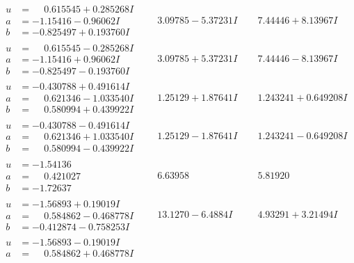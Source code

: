 \documentclass[1p]{elsarticle_modified}
\theoremstyle{definition}
\begin{document}
$$\begin{array}{c|c|c}
\begin{aligned}
u &= \phantom{-}0.615545 + 0.285268 I \\
a &= -1.15416 - 0.96062 I \\
b &= -0.825497 + 0.193760 I\end{aligned}
 & \phantom{-}3.09785 - 5.37231 I & \phantom{-}7.44446 + 8.13967 I \\ \hline\begin{aligned}
u &= \phantom{-}0.615545 - 0.285268 I \\
a &= -1.15416 + 0.96062 I \\
b &= -0.825497 - 0.193760 I\end{aligned}
 & \phantom{-}3.09785 + 5.37231 I & \phantom{-}7.44446 - 8.13967 I \\ \hline\begin{aligned}
u &= -0.430788 + 0.491614 I \\
a &= \phantom{-}0.621346 - 1.033540 I \\
b &= \phantom{-}0.580994 + 0.439922 I\end{aligned}
 & \phantom{-}1.25129 + 1.87641 I & \phantom{-}1.243241 + 0.649208 I \\ \hline\begin{aligned}
u &= -0.430788 - 0.491614 I \\
a &= \phantom{-}0.621346 + 1.033540 I \\
b &= \phantom{-}0.580994 - 0.439922 I\end{aligned}
 & \phantom{-}1.25129 - 1.87641 I & \phantom{-}1.243241 - 0.649208 I \\ \hline\begin{aligned}
u &= -1.54136\phantom{ +0.000000I} \\
a &= \phantom{-}0.421027\phantom{ +0.000000I} \\
b &= -1.72637\phantom{ +0.000000I}\end{aligned}
 & \phantom{-}6.63958\phantom{ +0.000000I} & \phantom{-}5.81920\phantom{ +0.000000I} \\ \hline\begin{aligned}
u &= -1.56893 + 0.19019 I \\
a &= \phantom{-}0.584862 - 0.468778 I \\
b &= -0.412874 - 0.758253 I\end{aligned}
 & \phantom{-}13.1270 - 6.4884 I & \phantom{-}4.93291 + 3.21494 I \\ \hline\begin{aligned}
u &= -1.56893 - 0.19019 I \\
a &= \phantom{-}0.584862 + 0.468778 I \\

\end{aligned}
\end{array}$$
\end{document}
